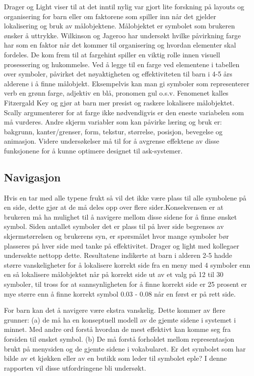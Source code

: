 \documentclass[phd,tocprelim]{cornell}
\begin{document}
Drager og Light \cite{aac} viser til at det inntil nylig var gjort lite forskning på layouts og organisering for barn eller om faktorene som spiller inn når det gjelder lokalisering og bruk av målobjektene. Målobjektet er symbolet som brukeren ønsker å uttrykke. Wilkinson og Jageroo \cite{Wilkinson2006} har undersøkt hvilke påvirkning farge har som en faktor når det kommer til organisering og hvordan elementer skal fordeles. De kom frem til at fargehint spiller en viktig rolle innen visuell prosessering  og hukommelse. Ved å legge til en farge ved elementene i tabellen over symboler, påvirket det nøyaktigheten og effektiviteten til barn i 4-5 års alderene i å finne målobjekt. Eksempelvis kan man gi symboler som representerer verb en grønn farge, adjektiv en blå, pronomen gul o.s.v. Fenomenet kalles Fitzergald Key og gjør at barn mer presist og raskere lokalisere målobjektet. Scally \cite{Scally} argumenterer for at farge ikke nødvendigvis er den eneste variabelen som må vurderes. Andre skjerm variabler som kan påvirke læring og bruk er: bakgrunn, kanter/grenser, form, tekstur, størrelse, posisjon, bevegelse og animasjon. Videre undersøkelser må til for å avgrense effektene av disse funksjonene for å kunne optimere designet til ask-systemer.


\subsection{Navigasjon}
\label{subsec:navigasjon}

Hvis en tar med alle typene frukt så vil det ikke være plass til alle symbolene på en side, dette gjør at de må deles opp over flere sider.Konsekvensen er at brukeren må ha mulighet til å navigere mellom disse sidene for å finne ønsket symbol. Siden antallet symboler det er plass til på hver side begrenses av skjermstørrelsen og brukerens syn, er spørsmålet hvor mange symboler bør plasseres på hver side med tanke på effektivitet. Drager og light med kollegaer undersøkte nettopp dette. Resultatene indikerte at barn i alderen 2-5 hadde større vanskeligheter for å lokalisere korrekt side fra en meny med 4 symboler enn en så lokalisere målobjektet når på korrekt side ut av et valg på 12 til 30 symboler, til tross for at sannsynligheten for å finne korrekt side er 25 prosent er mye større enn å finne korrekt symbol 0.03 - 0.08 når en først er på rett side.

For barn kan det å navigere være ekstra vanskelig. Dette kommer av flere grunner: (a) de må ha en konseptuell modell av de gjemte sidene i systemet i minnet. Med andre ord forstå hvordan de mest effektivt kan komme seg fra forsiden til ønsket symbol. (b) De må forstå forholdet mellom representasjon brukt på menysiden og de gjemte sidene i vokabularet. Er det symbolet som har bilde av et kjøkken eller av en butikk som leder til symbolet eple? I denne rapporten vil disse utfordringene bli undersøkt.
\end{document}
